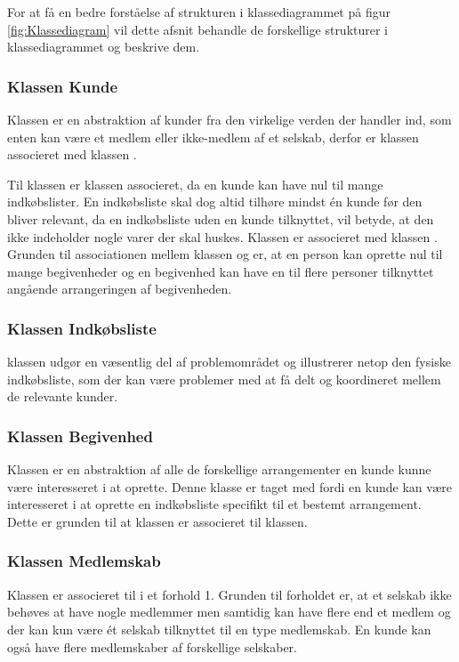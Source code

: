 For at få en bedre forståelse af strukturen i klassediagrammet på figur \ref{fig:Klassediagram} vil dette afsnit behandle de forskellige strukturer i klassediagrammet og beskrive dem.

\subsubsection{Klassen Kunde}
Klassen  er en abstraktion af kunder fra den virkelige verden der handler ind, som enten kan være et medlem eller ikke-medlem af et selskab, derfor er klassen  associeret med klassen .

Til klassen  er klassen  associeret, da en kunde kan have nul til mange indkøbslister. En indkøbsliste skal dog altid tilhøre mindst én kunde før den bliver relevant, da en indkøbsliste uden en kunde tilknyttet, vil betyde, at den ikke indeholder nogle varer der skal huskes.
Klassen  er associeret med klassen . Grunden til associationen mellem klassen  og  er, at en person kan oprette nul til mange begivenheder og en begivenhed kan have en til flere personer tilknyttet angående arrangeringen af begivenheden.

\subsubsection{Klassen Indkøbsliste}
 klassen udgør en væsentlig del af problemområdet og illustrerer netop den fysiske indkøbsliste, som der kan være problemer med at få delt og koordineret mellem de relevante kunder.

\subsubsection{Klassen Begivenhed}
Klassen  er en abstraktion af alle de forskellige arrangementer en kunde kunne være interesseret i at oprette. Denne klasse er taget med fordi en kunde kan være interesseret i at oprette en indkøbsliste specifikt til et bestemt arrangement. Dette er grunden til at klassen  er associeret til  klassen.

\subsubsection{Klassen Medlemskab}
Klassen  er associeret til  i et forhold 1. Grunden til forholdet er, at et selskab ikke behøves at have nogle medlemmer men samtidig kan have flere end et medlem og der kan kun være ét selskab tilknyttet til en type medlemskab. 
En kunde kan også have flere medlemskaber af forskellige selskaber.

